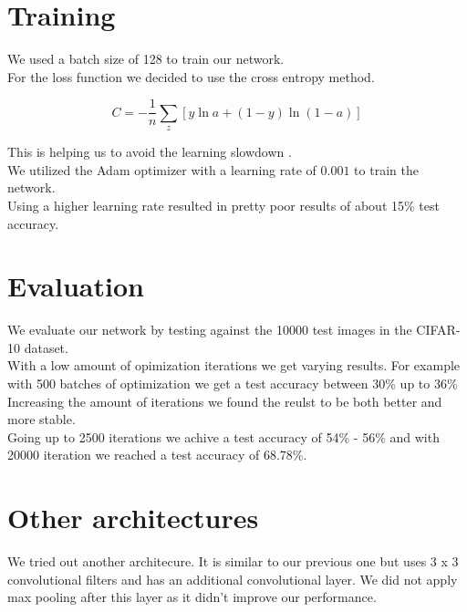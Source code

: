\documentclass[twoside, twocolumn]{article}
\begin{document}

\section{Training}

We used a batch size of 128 to train our network. \\
For the loss function we decided to use the cross entropy method.

\begin{equation}
 C = - \dfrac{1}{n} \sum_{z} [y \ln a + (1 - y) \ln (1 - a)]
\end{equation}

This is helping us to avoid the learning slowdown \cite{crossentro}.\\
We utilized the Adam optimizer with a learning rate of $0.001$ to train the network. \\
Using a higher learning rate resulted in pretty poor results of about 15\% test accuracy.


\section{Evaluation}
We evaluate our network by testing against the 10000 test images in the CIFAR-10 dataset. \\
With a low amount of opimization iterations we get varying results. For example with 500 batches of optimization we get a test accuracy between 30\% up to 36\% \\
Increasing the amount of iterations we found the reulst to be both better and more stable. \\
Going up to 2500 iterations we achive a test accuracy of 54\% - 56\% and with 20000 iteration we reached a test accuracy of 68.78\%.




\section{Other architectures}
We tried out another architecure. It is similar to our previous one but uses 3 x 3 convolutional filters and has an additional convolutional layer. We did not apply max pooling after this layer as it didn't improve our performance. \\
\end{document}
